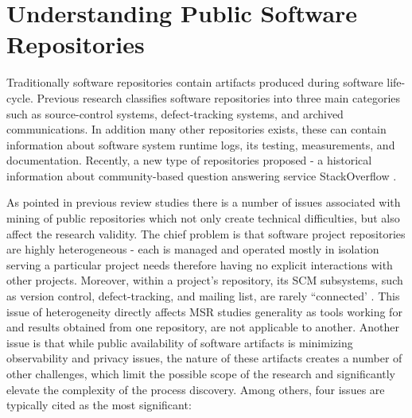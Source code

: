 \section{Understanding Public Software Repositories}
Traditionally software repositories contain artifacts produced during software life-cycle. 
Previous research classifies software repositories into three main categories \cite{citeulike:4534888} such as 
source-control systems, defect-tracking systems, and archived communications. In addition many other repositories 
exists, these can contain information about software system runtime logs, its testing, measurements, and documentation.
Recently, a new type of repositories proposed - a historical information about community-based question answering service 
StackOverflow \cite{MSRChallenge2013}.

As pointed in previous review studies \cite{citeulike:12550438} \cite{citeulike:7853299} \cite{citeulike:7465518} there
is a number of issues associated with mining of public repositories which not only create technical difficulties, but also affect 
the research validity. 
The chief problem is that software project repositories are highly heterogeneous - each is managed and operated 
mostly in isolation serving a particular project needs therefore having no explicit interactions with other projects. 
Moreover, within a project's repository, its SCM subsystems, such as version control, defect-tracking, and mailing list, 
are rarely ``connected'  \cite{citeulike:13058334}. 
This issue of heterogeneity directly affects MSR studies generality as tools working for and results obtained from one repository,
are not applicable to another.
Another issue is that while public availability of software artifacts is minimizing observability and privacy issues, 
the nature of these artifacts creates a number of other challenges, which limit the possible scope of the research and 
significantly elevate the complexity of the process discovery. Among others, four issues are typically cited as the most significant:
